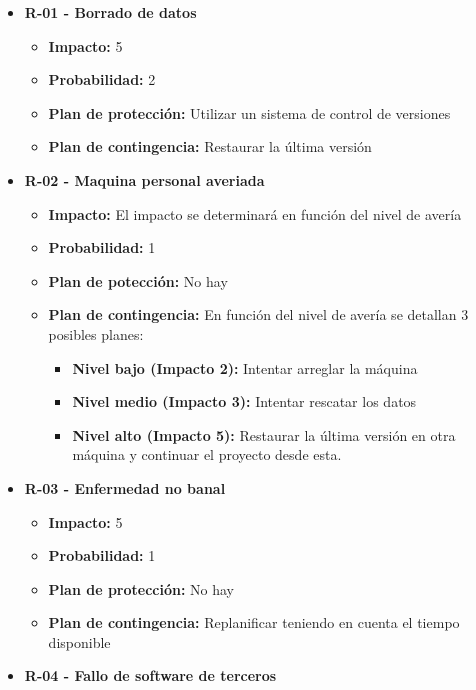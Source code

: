 \documentclass[openright,twoside,10pt]{book}
\providecommand{\tightlist}{%
  \setlength{\itemsep}{0pt}\setlength{\parskip}{0pt}}
\begin{document}
    \begin{itemize}
    \tightlist
    \item
      \textbf{R-01 - Borrado de datos}
    
      \begin{itemize}
      \tightlist
      \item
        \textbf{Impacto:} 5
      \item
        \textbf{Probabilidad:} 2
      \item
        \textbf{Plan de protección:} Utilizar un sistema de control de
        versiones
      \item
        \textbf{Plan de contingencia:} Restaurar la última versión
      \end{itemize}
    \item
      \textbf{R-02 - Maquina personal averiada}
    
      \begin{itemize}
      \tightlist
      \item
        \textbf{Impacto:} El impacto se determinará en función del nivel de
        avería
      \item
        \textbf{Probabilidad:} 1
      \item
        \textbf{Plan de potección:} No hay
      \item
        \textbf{Plan de contingencia:} En función del nivel de avería se
        detallan 3 posibles planes:
    
        \begin{itemize}
        \tightlist
        \item
          \textbf{Nivel bajo (Impacto 2):} Intentar arreglar la máquina
        \item
          \textbf{Nivel medio (Impacto 3):} Intentar rescatar los datos
        \item
          \textbf{Nivel alto (Impacto 5):} Restaurar la última versión en
          otra máquina y continuar el proyecto desde esta.
        \end{itemize}
      \end{itemize}
    \item
      \textbf{R-03 - Enfermedad no banal}
    
      \begin{itemize}
      \tightlist
      \item
        \textbf{Impacto:} 5
      \item
        \textbf{Probabilidad:} 1
      \item
        \textbf{Plan de protección:} No hay
      \item
        \textbf{Plan de contingencia:} Replanificar teniendo en cuenta el
        tiempo disponible
      \end{itemize}
    \item
      \textbf{R-04 - Fallo de software de terceros}
    

\end{itemize}
\end{document}
